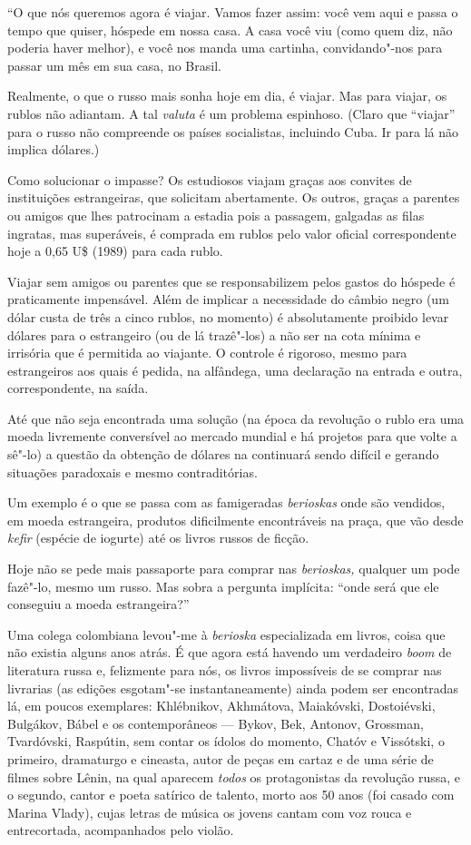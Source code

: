 ``O que nós queremos agora é viajar. Vamos fazer assim: você vem aqui e
passa o tempo que quiser, hóspede em nossa casa. A casa você viu (como
quem diz, não poderia haver melhor), e você nos manda uma cartinha,
convidando"-nos para passar um mês em sua casa, no Brasil.

Realmente, o que o russo mais sonha hoje em dia, é viajar. Mas para
viajar, os rublos não adiantam. A tal \emph{valuta} é um problema
espinhoso. (Claro que ``viajar'' para o russo não compreende os países
socialistas, incluindo Cuba. Ir para lá não implica dólares.)

Como solucionar o impasse? Os estudiosos viajam graças aos convites de
instituições estrangeiras, que solicitam abertamente. Os outros, graças
a parentes ou amigos que lhes patrocinam a estadia pois a passagem,
galgadas as filas ingratas, mas superáveis, é comprada em rublos pelo
valor oficial correspondente hoje a 0,65 U\$ (1989) para cada rublo.

Viajar sem amigos ou parentes que se responsabilizem pelos gastos do
hóspede é praticamente impensável. Além de implicar a necessidade do
câmbio negro (um dólar custa de três a cinco rublos, no momento) é
absolutamente proibido levar dólares para o estrangeiro (ou de lá
trazê"-los) a não ser na cota mínima e irrisória que é permitida ao
viajante. O controle é rigoroso, mesmo para estrangeiros aos quais é
pedida, na alfândega, uma declaração na entrada e outra, correspondente,
na saída.

Até que não seja encontrada uma solução (na época da revolução o rublo
era uma moeda livremente conversível ao mercado mundial e há projetos
para que volte a sê"-lo) a questão da obtenção de dólares na 
continuará sendo difícil e gerando situações paradoxais e mesmo
contraditórias.

Um exemplo é o que se passa com as famigeradas \emph{berioskas} onde são
vendidos, em moeda estrangeira, produtos dificilmente encontráveis na
praça, que vão desde \emph{kefir} (espécie de iogurte) até os livros
russos de ficção.

Hoje não se pede mais passaporte para comprar nas \emph{berioskas,}
qualquer um pode fazê"-lo, mesmo um russo. Mas sobra a pergunta
implícita: ``onde será que ele conseguiu a moeda estrangeira?''

Uma colega colombiana levou"-me à \emph{berioska} especializada em
livros, coisa que não existia alguns anos atrás. É que agora está
havendo um verdadeiro \emph{boom} de literatura russa e, felizmente para
nós, os livros impossíveis de se comprar nas livrarias (as edições
esgotam"-se instantaneamente) ainda podem ser encontradas lá, em poucos
exemplares: Khlébnikov, Akhmátova, Maiakóvski, Dostoiévski, Bulgákov,
Bábel e os contemporâneos --- Bykov, Bek, Antonov, Grossman, Tvardóvski,
Raspútin, sem contar os ídolos do momento, Chatóv e Vissótski, o
primeiro, dramaturgo e cineasta, autor de peças em cartaz e de uma série
de filmes sobre Lênin, na qual aparecem \emph{todos} os protagonistas da
revolução russa, e o segundo, cantor e poeta satírico de talento, morto
aos 50 anos (foi casado com Marina Vlady), cujas letras de música os
jovens cantam com voz rouca e entrecortada, acompanhados pelo violão.

